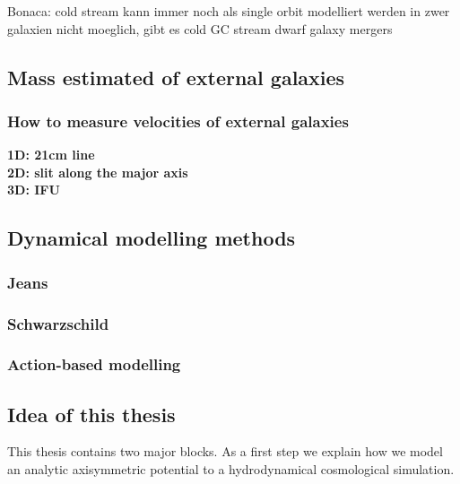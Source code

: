    
Bonaca: cold stream kann immer noch als single orbit modelliert werden 
in zwer galaxien nicht moeglich, gibt es cold GC stream dwarf galaxy mergers


\subsection{Mass estimated of external galaxies}\label{subsec:mass_est_ext}
\subsubsection{How to measure velocities of external galaxies}
\textbf{1D: 21cm line}\\
\textbf{2D: slit along the major axis}\\
\textbf{3D: \ac{IFU}}

\subsection{Dynamical modelling methods}
\subsubsection{Jeans}
\subsubsection{Schwarzschild}
\subsubsection{Action-based modelling}

\subsection{Idea of this thesis}
This thesis contains two major blocks. As a first step we explain how we model an analytic axisymmetric potential to a hydrodynamical cosmological simulation. 